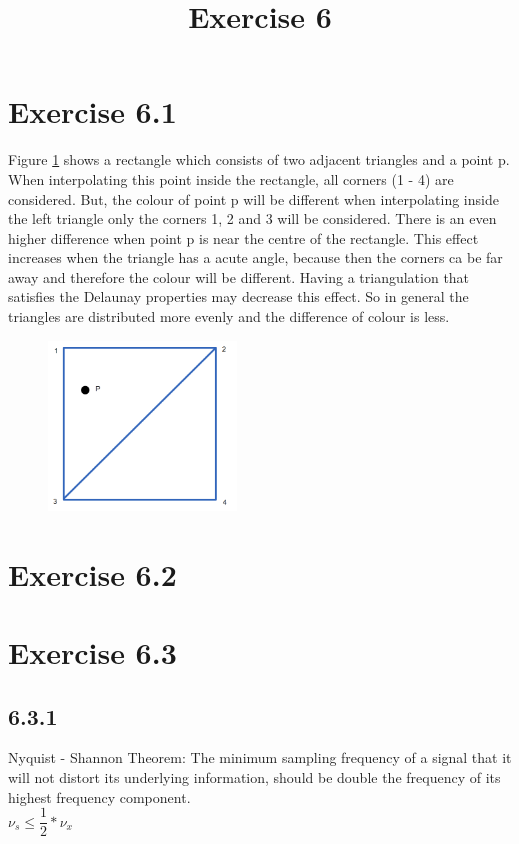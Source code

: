 \documentclass[a4paper]{article}
\date{}
\author{}
\title{Exercise 6}
\begin{document}
\maketitle 
\thispagestyle{fancy}


\section*{Exercise 6.1}

Figure \ref{fig:triangle} shows a rectangle which consists of two adjacent triangles and a point p. 
When interpolating this point inside the rectangle, all corners (1 - 4) are considered. 
But, the colour of point p will be different when interpolating inside the left triangle only the corners 1, 2 and 3 will be considered. 
There is an even higher difference when point p is near the centre of the rectangle. 
This effect increases when the triangle has a acute angle, because then the corners ca be far away and therefore the colour will be different. 
Having a triangulation that satisfies the Delaunay properties may decrease this effect. 
So in general the triangles are distributed more evenly and the difference of colour is less. 

\begin{figure}[h!]
	\centering 
	\includegraphics[width=5cm]{A1.png}
	\caption{}
	\label{fig:triangle}
\end{figure}

\section*{Exercise 6.2}


\section*{Exercise 6.3}

\subsection*{6.3.1}
Nyquist - Shannon Theorem:
The minimum sampling frequency of a signal that it will not distort its underlying information, should be double the frequency of its highest frequency component.\\
$ \nu_s \leq \dfrac{1}{2} * \nu_x $
\end{document}
